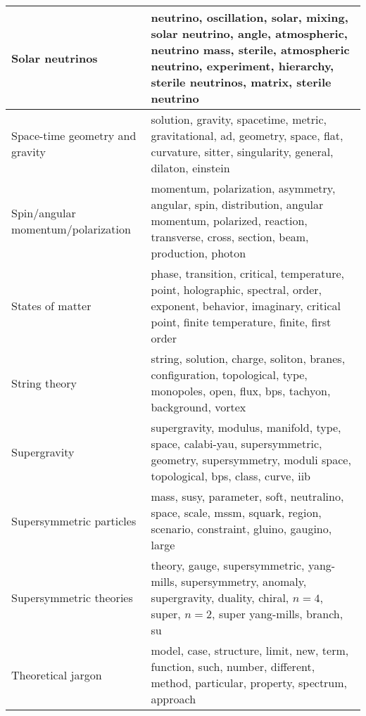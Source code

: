 \begin{longtable}[H]{p{}|p{}}
Solar neutrinos                                       &                 neutrino, oscillation, solar, mixing, solar neutrino, angle, atmospheric, neutrino mass, sterile, atmospheric neutrino, experiment, hierarchy, sterile neutrinos, matrix, sterile neutrino \\ \midrule
Space-time geometry and gravity                       &                                                                 solution, gravity, spacetime, metric, gravitational, ad, geometry, space, flat, curvature, sitter, singularity, general, dilaton, einstein \\ \midrule
Spin/angular momentum/polarization                    &                                                momentum, polarization, asymmetry, angular, spin, distribution, angular momentum, polarized, reaction, transverse, cross, section, beam, production, photon \\ \midrule
States of matter                                      &                                      phase, transition, critical, temperature, point, holographic, spectral, order, exponent, behavior, imaginary, critical point, finite temperature, finite, first order \\ \midrule
String theory                                         &                                                                       string, solution, charge, soliton, branes, configuration, topological, type, monopoles, open, flux, bps, tachyon, background, vortex \\ \midrule
Supergravity                                          &                                                       supergravity, modulus, manifold, type, space, calabi-yau, supersymmetric, geometry, supersymmetry, moduli space, topological, bps, class, curve, iib \\ \midrule
Supersymmetric particles                              &                                                                                  mass, susy, parameter, soft, neutralino, space, scale, mssm, squark, region, scenario, constraint, gluino, gaugino, large \\ \midrule
Supersymmetric theories                               &                                                        theory, gauge, supersymmetric, yang-mills, supersymmetry, anomaly, supergravity, duality, chiral, $n=4$, super, $n=2$, super yang-mills, branch, su \\ \midrule
Theoretical jargon                                    &                                                                              model, case, structure, limit, new, term, function, such, number, different, method, particular, property, spectrum, approach \\ \midrule

\end{longtable}
